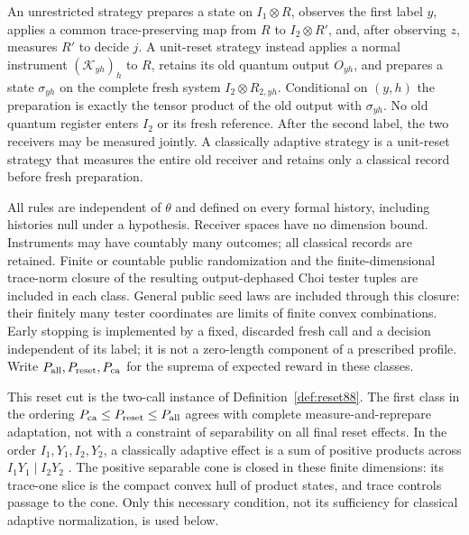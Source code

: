 \begin{definition}\label{def:classes91}
An unrestricted strategy prepares a state on $I_1\otimes R$, observes
the first label $y$, applies a common trace-preserving map from $R$ to
$I_2\otimes R'$, and, after observing $z$, measures $R'$ to decide $j$.
A unit-reset strategy instead applies a normal instrument
$(\mathcal K_{yh})_h$ to $R$, retains its old quantum output $O_{yh}$,
and prepares a state $\sigma_{yh}$ on the complete fresh system
$I_2\otimes R_{2,yh}$.  Conditional on $(y,h)$ the preparation is
exactly the tensor product of the old output with $\sigma_{yh}$.
No old quantum register enters $I_2$ or its fresh reference.  After the
second label, the two receivers may be measured jointly.  A classically
adaptive strategy is a unit-reset strategy that measures the entire old
receiver and retains only a classical record before fresh preparation.

All rules are independent of $\theta$ and defined on every formal
history, including histories null under a hypothesis.  Receiver spaces
have no dimension bound.  Instruments may have countably many outcomes;
all classical records are retained.  Finite or countable public
randomization and the
finite-dimensional trace-norm closure of the resulting output-dephased
Choi tester tuples are included in each class.  General public seed laws
are included through this closure: their finitely many tester coordinates
are limits of finite convex combinations.  Early stopping is
implemented by a fixed, discarded fresh call and a decision independent
of its label; it is not a zero-length component of a prescribed profile.
Write $P_{\rm all},P_{\rm reset},P_{\rm ca}$ for the suprema of expected
reward in these classes.
\end{definition}
This reset cut is the two-call instance of Definition~\ref{def:reset88}.
The first class in the ordering
$P_{\rm ca}\le P_{\rm reset}\le P_{\rm all}$ agrees with complete
measure-and-reprepare adaptation, not with a constraint of separability
on all final reset effects.  In the order $I_1,Y_1,I_2,Y_2$, a
classically adaptive effect is a sum of positive products across
$I_1Y_1\mid I_2Y_2$ \cite[Definition~23]{OZNPQ89}.
The positive separable cone is closed in these finite dimensions:
its trace-one slice is the compact convex hull of product states, and
trace controls passage to the cone.  Only this necessary condition,
not its sufficiency for classical adaptive normalization, is used below.

